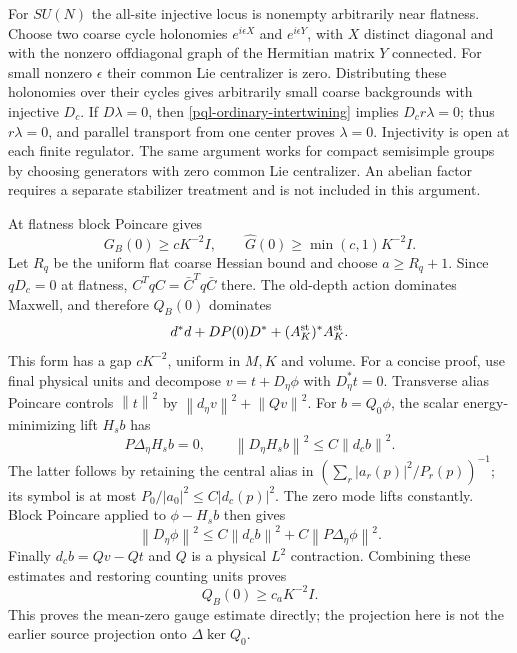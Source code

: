 \documentclass[11pt]{article}
\newcommand{\norm}[1]{\left\lVert#1\right\rVert}
\theoremstyle{remark}
\begin{document}
For $SU(N)$ the all-site injective locus is nonempty arbitrarily near
flatness. Choose two coarse cycle holonomies $e^{i\epsilon X}$ and
$e^{i\epsilon Y}$, with $X$ distinct diagonal and with the nonzero
offdiagonal graph of the Hermitian matrix $Y$ connected. For small
nonzero $\epsilon$ their common Lie centralizer is zero. Distributing
these holonomies over their cycles gives arbitrarily small coarse
backgrounds with injective $D_c$. If $D\lambda=0$, then
\eqref{pql-ordinary-intertwining} implies $D_cr\lambda=0$;
thus $r\lambda=0$, and parallel transport from one center proves
$\lambda=0$. Injectivity is open at each finite regulator. The same
argument works for compact semisimple groups by choosing generators
with zero common Lie centralizer. An abelian factor requires a separate
stabilizer treatment and is not included in this argument.

At flatness block Poincare gives
\begin{equation}
 G_B(0)\ge cK^{-2}I,\qquad
 \widehat G(0)\ge\min(c,1)K^{-2}I.
 \label{pql-scalar-gap}
\end{equation}
Let $R_q$ be the uniform flat coarse Hessian bound and choose
$a\ge R_q+1$. Since $qD_c=0$ at flatness,
$C^TqC=\bar C^Tq\bar C$ there. The old-depth action dominates
Maxwell, and therefore $Q_B(0)$ dominates
\begin{equation}
 d^*d+D P(0)D^*+(A_K^{\rm st})^*A_K^{\rm st}.
 \label{pql-dominated-form}
\end{equation}
This form has a gap $cK^{-2}$, uniform in $M,K$ and volume.
For a concise proof, use final physical units and decompose
$v=t+D_\eta\phi$ with $D_\eta^*t=0$. Transverse alias Poincare
controls $\norm{t}^2$ by $\norm{d_\eta v}^2+\norm{Qv}^2$.
For $b=Q_0\phi$, the scalar energy-minimizing lift $H_sb$ has
\[
 P\Delta_\eta H_sb=0,\qquad
 \norm{D_\eta H_sb}^2\le C\norm{d_cb}^2.
\]
The latter follows by retaining the central alias in
$(\sum_r|a_r(p)|^2/P_r(p))^{-1}$; its symbol is at most
$P_0/|a_0|^2\le C|d_c(p)|^2$. The zero mode lifts constantly.
Block Poincare applied to $\phi-H_sb$ then gives
\[
 \norm{D_\eta\phi}^2
 \le C\norm{d_cb}^2+C\norm{P\Delta_\eta\phi}^2.
\]
Finally $d_cb=Qv-Qt$ and $Q$ is a physical $L^2$ contraction.
Combining these estimates and restoring counting units proves
\begin{equation}
 Q_B(0)\ge c_aK^{-2}I.
 \label{pql-vector-gap}
\end{equation}
This proves the mean-zero gauge estimate directly; the projection
here is not the earlier source projection onto $\Delta\ker Q_0$.
\end{document}
